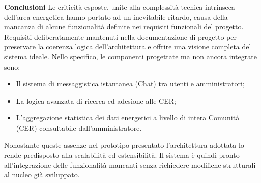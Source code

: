 \textbf{Conclusioni}
Le criticità esposte, unite alla complessità tecnica intrinseca dell'area energetica hanno portato ad un inevitabile ritardo, causa della mancanza di alcune funzionalità definite nei requisiti funzionali del progetto. Requisiti deliberatamente mantenuti nella documentazione di progetto per preservare la coerenza logica dell'architettura e offrire una visione completa del sistema ideale.
Nello specifico, le componenti progettate ma non ancora integrate sono: 
\begin{itemize}
    \item Il sistema di messaggistica istantanea (Chat) tra utenti e amministratori;
    \item La logica avanzata di ricerca ed adesione alle CER;
    \item L'aggregazione statistica dei dati energetici a livello di intera Comunità (CER) consultabile dall'amministratore.
\end{itemize}
Nonostante queste assenze nel prototipo presentato l'architettura adottata lo rende predisposto alla scalabilità ed estensibilità. Il sistema è quindi pronto all'integrazione delle funzionalità mancanti senza richiedere modifiche strutturali al nucleo già sviluppato.